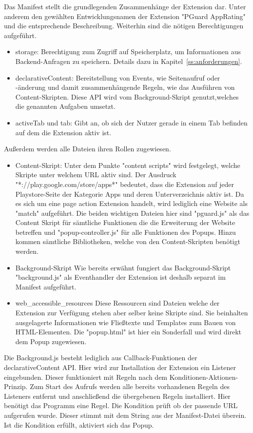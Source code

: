 Das Manifest stellt die grundlegenden Zusammenhänge der Extension dar. Unter anderem den gewählten Entwicklungsnamen der Extension "PGuard AppRating" und die entsprechende Beschreibung.
Weiterhin sind die nötigen Berechtigungen aufgeführt.
\begin{itemize}
	\item storage:
	Berechtigung zum Zugriff auf Speicherplatz, um Informationen aus Backend-Anfragen zu speichern. Details dazu in Kapitel~\ref{ss:anforderungen}.
	\item declarativeContent:
	Bereitstellung von Events, wie Seitenaufruf oder -änderung und damit zusammenhängende Regeln, wie das Ausführen von Content-Skripten. Diese API wird vom Background-Skript genutzt,welches die genannten Aufgaben umsetzt.
	\item activeTab und tab:
	Gibt an, ob sich der Nutzer gerade in einem Tab befinden auf dem die Extension aktiv ist.
\end{itemize}
Außerdem werden alle Dateien ihren Rollen zugewiesen.
\begin{itemize}
	\item Content-Skript:
	Unter dem Punkte "content scripts" wird festgelegt, welche Skripte unter welchem URL aktiv sind. Der Ausdruck 
	"*://play.google.com/store/apps*" 
	bedeutet, dass die Extension auf jeder Playstore-Seite der Kategorie Apps und deren Unterverzeichnis aktiv ist. Da es sich um eine page action Extension handelt, wird lediglich eine Website als "match" aufgeführt. Die beiden wichtigen Dateien hier sind "pguard.js" als das Content Skript für sämtliche Funktionen die die Erweiterung der Website betreffen und "popup-controller.js" für alle Funktionen des Popups. Hinzu kommen sämtliche Bibliotheken, welche von den Content-Skripten benötigt werden.
	\item Background-Skript
	Wie bereits erwähnt fungiert das Background-Skript "background.js" als Eventhandler der Extension ist deshalb separat im Manifest aufgeführt.
	\item web\_accessible\_resources
	Diese Ressourcen sind Dateien welche der Extension zur Verfügung stehen aber selber keine Skripte sind. Sie beinhalten ausgelagerte Informationen wie Fließtexte und Templates zum Bauen von HTML-Elementen. Die "popup.html" ist hier ein Sonderfall und wird direkt dem Popup zugewiesen.
\end{itemize}

Die Background.js besteht lediglich aus Callback-Funktionen der declarativeContent API. Hier wird zur Installation der Extension ein Listener eingebunden. Dieser funktioniert mit Regeln nach dem Konditionen-Aktionen-Prinzip. Zum Start des Aufrufs werden alle bereits vorhandenen Regeln des Listeners entfernt und anschließend die übergebenen Regeln installiert.
Hier benötigt das Programm eine Regel. Die Kondition prüft ob der passende URL aufgerufen wurde. Dieser stimmt mit dem String aus der Manifest-Datei überein. Ist die Kondition erfüllt, aktiviert sich das Popup.


